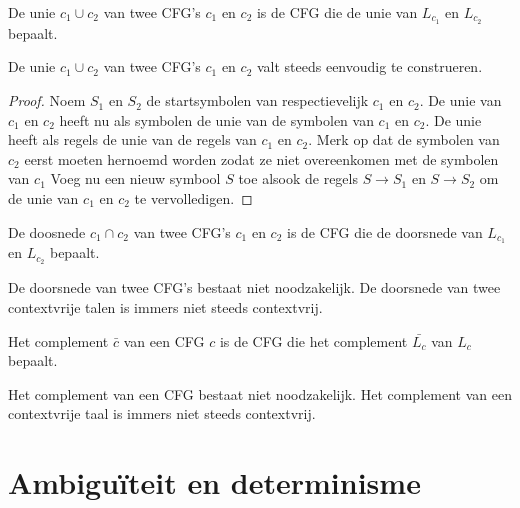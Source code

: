 \documentclass[main.tex]{subfiles}
\begin{document}
\begin{de}
  De unie $c_{1} \cup c_{2}$ van twee CFG's $c_{1}$ en $c_{2}$ is de CFG die de unie van $L_{c_{1}}$ en $L_{c_{2}}$ bepaalt.
\end{de}

\begin{st}
  De unie $c_{1} \cup c_{2}$ van twee CFG's $c_{1}$ en $c_{2}$ valt steeds eenvoudig te construeren.
  
  \begin{proof}
    Noem $S_{1}$ en $S_{2}$ de startsymbolen van respectievelijk $c_{1}$ en $c_{2}$.
    De unie van $c_{1}$ en $c_{2}$ heeft nu als symbolen de unie van de symbolen van $c_{1}$ en $c_{2}$.
    De unie heeft als regels de unie van de regels van $c_{1}$ en $c_{2}$.
    Merk op dat de symbolen van $c_{2}$ eerst moeten hernoemd worden zodat ze niet overeenkomen met de symbolen van $c_{1}$
    Voeg nu een nieuw symbool $S$ toe alsook de regels $S\rightarrow S_{1}$ en $S\rightarrow S_{2}$ om de unie van $c_{1}$ en $c_{2}$ te vervolledigen.
  \end{proof}
\end{st}

\begin{de}
  De doosnede $c_{1} \cap c_{2}$ van twee CFG's $c_{1}$ en $c_{2}$ is de CFG die de doorsnede van $L_{c_{1}}$ en $L_{c_{2}}$ bepaalt.
\end{de}

\begin{st}
  De doorsnede van twee CFG's bestaat niet noodzakelijk.
  De doorsnede van twee contextvrije talen is immers niet steeds contextvrij.
\end{st}

\begin{de}
  Het complement $\bar{c}$ van een CFG $c$ is de CFG die het complement $\bar{L_{c}}$ van $L_{c}$ bepaalt.
\end{de}

\begin{st}
  Het complement van een CFG bestaat niet noodzakelijk.
  Het complement van een contextvrije taal is immers niet steeds contextvrij.
\end{st}


\section{Ambigu\"iteit en determinisme}
\end{document}
